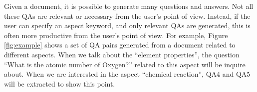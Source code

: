 Given a document, it is possible to generate many questions and answers.
Not all these QAs are relevant or necessary from the user's point of view. 
Instead, if the user can specify an aspect keyword, and only relevant
QAs are generated, this is often more productive from the user's point of
view.
For example, Figure \ref{fig:example} shows a set of QA pairs generated from a document related to different aspects. 
When we talk about the ``element properties'', the question ``What is the atomic number of Oxygen?'' related to this aspect will be inquire about.
When we are interested in the aspect ``chemical reaction'', QA4 and QA5 will be extracted to show this point.
